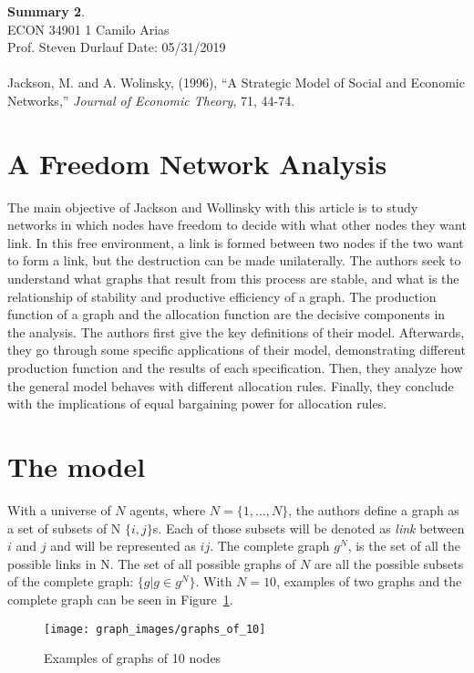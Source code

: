 \documentclass[a4paper, 11pt]{article}
\begin{document}
\noindent
\large\textbf{Summary 2}.\\
\normalsize ECON 34901 1 \hfill Camilo Arias \\
Prof. Steven Durlauf \hfill Date: 05/31/2019 \\\\
\large 
Jackson, M. and A. Wolinsky, (1996), “A Strategic Model of Social and Economic Networks,”
\textit{Journal of Economic Theory}, 71, 44-74.

\section*{A Freedom Network Analysis}

The main objective of Jackson and Wollinsky with this article is to study networks in which nodes have freedom to decide with what other nodes they want link. In this free environment, a link is formed between two nodes if the two want to form a link, but the destruction can be made unilaterally. The authors seek to understand what graphs that result from this process are stable, and what is the relationship of stability and productive efficiency of a graph. The production function of a graph and the allocation function are the decisive components in the analysis. The authors first give the key definitions of their model. Afterwards, they go through some specific applications of their model, demonstrating different production function and the results of each specification. Then, they analyze how the general model behaves with different allocation rules. Finally, they conclude with the implications of equal bargaining power for allocation rules.

\section*{The model}
With a universe of $N$ agents, where $N = \{1, ..., N\}$, the authors define a graph as a set of subsets of N $\{i, j\}$s. Each of those subsets will be denoted as \textit{link} between $i$ and $j$ and will be represented as $ij$. The complete graph $g^N$, is the set of all the possible links in N. The set of all possible graphs of $N$ are all the possible subsets of the complete graph: $\{g | g \in g^N\}$. With $N = 10$, examples of two graphs and the complete graph can be seen in Figure~\ref{fig:examples}.

\begin{figure}[hbt!]
    \centering
     \caption{Examples of graphs of 10 nodes}
     \label{fig:examples}
     \texttt{[image: graph\_images/graphs\_of\_10]}
\end{figure}
\end{document}
